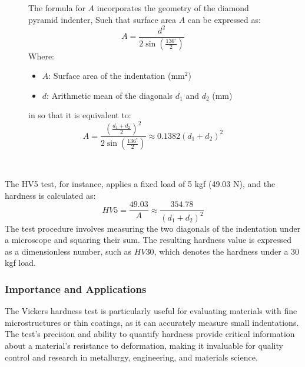 \documentclass{article}
\begin{document}
\begin{figure}[H]
\begin{minipage}{0.51\textwidth}
\begin{itemize}[itemsep=-1mm]
            \end{itemize}
            The formula for $A$ incorporates the geometry of the diamond pyramid indenter, 
            Such that surface area \(A\) can be expressed as:
            \begin{equation}
                A = \frac{d^2}{2\sin\left(\frac{136^\circ}{2}\right)}
            \end{equation}
            Where:  
            \begin{itemize}[itemsep=-1mm]
                \item \(A\): Surface area of the indentation (mm\(^2\))
                \item \(d\): Arithmetic mean of the diagonals \(d_1\) and \(d_2\) (mm)
            \end{itemize}
            in so that it is equivalent to:
            \begin{equation}
                    A= \frac{\left(\frac{d_1+d_2}{2}\right)^2}{2\sin\left(\frac{136^\circ}{2}\right)} \approx 0.1382\left(d_1 + d_2\right)^2
            \end{equation}
        \end{minipage}\\
    \end{figure}
    \vspace{-0.1em}\noindent
    The HV5 test, for instance, applies a fixed load of 5 kgf (49.03 N), and the hardness is calculated as:  
    \begin{equation}
        HV5 = \frac{49.03}{A} \approx \frac{354.78}{\left(d_1 + d_2\right)^2}
    \end{equation}
The test procedure involves measuring the two diagonals of the indentation under a microscope and squaring their sum. The resulting hardness value is expressed as a dimensionless number, such as \(HV30\), which denotes the hardness under a 30 kgf load.  

\subsubsection*{Importance and Applications}  

The Vickers hardness test is particularly useful for evaluating materials with fine microstructures or thin coatings, as it can accurately measure small indentations. The test’s precision and ability to quantify hardness provide critical information about a material’s resistance to deformation, making it invaluable for quality control and research in metallurgy, engineering, and materials science.  
\end{document}
